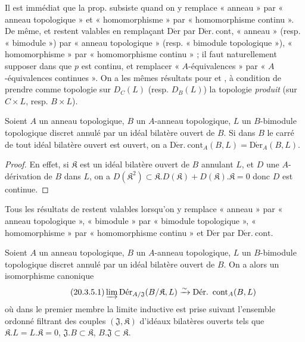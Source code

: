 \begin{env}[20.3.2]
\label{0.20.3.2-fr}
Il est immédiat que la prop.  subsiste quand on y remplace
« anneau » par « anneau topologique » et « homomorphisme » par
« homomorphisme continu ». De même,  et
 restent valables en remplaçant $\operatorname{D\acute{e}r}$ par
$\operatorname{D\acute{e}r.\ cont}$, « anneau » (resp. « bimodule ») par « anneau
topologique » (resp. « bimodule topologique »), « homomorphisme » par
« homomorphisme continu » ; il faut naturellement supposer dans
 que $p$ est continu, et remplacer « $A$-équivalences » par
« $A$-équivalences continues ». On a les mêmes résultats pour
 et , à condition de prendre comme
topologie sur $D_C(L)$ (resp. $D_B(L)$) la topologie \emph{produit} (sur
$C\times L$, resp. $B\times L$).
\end{env}

\begin{proposition}[20.3.3]
\label{0.20.3.3-fr}
Soient $A$ un anneau topologique, $B$ un $A$-anneau topologique, $L$ un
$B$-bimodule topologique discret annulé par un idéal bilatère ouvert de $B$.
Si dans $B$ le carré de tout idéal bilatère ouvert est ouvert, on a
$\operatorname{D\acute{e}r.\ cont}_A(B,L)=\operatorname{D\acute{e}r}_A(B,L)$.
\end{proposition}

\begin{proof}
En effet, si $\mathfrak{K}$ est un idéal bilatère ouvert de $B$ annulant $L$,
et $D$ une $A$-dérivation de $B$ dans $L$, on a
$D(\mathfrak{K}^2)\subset\mathfrak{K}.D(\mathfrak{K})+
D(\mathfrak{K}).\mathfrak{K}=0$  donc $D$ est continue.
\end{proof}

\begin{env}[20.3.4]
\label{0.20.3.4-fr}
Tous les résultats de  restent valables lorsqu'on y remplace
« anneau » par « anneau topologique », « bimodule » par « bimodule
topologique », « homomorphisme » par « homomorphisme continu » et
$\operatorname{D\acute{e}r}$ par $\operatorname{D\acute{e}r.\ cont}$.
\end{env}

\begin{proposition}[20.3.5]
\label{0.20.3.5-fr}
Soient $A$ un anneau topologique, $B$ un $A$-anneau topologique, $L$ un
$B$-bimodule topologique discret annulé par un idéal bilatère ouvert de $B$.
On a alors un isomorphisme canonique
\begin{equation}
\tag{20.3.5.1}
\label{0.20.3.5.1-fr}
  \varinjlim\operatorname{D\acute{e}r}_{A/\mathfrak{J}}
  (B/\mathfrak{K},L)\xrightarrow{\sim}
  \operatorname{D\acute{e}r.\ cont}_A(B,L)
\end{equation}
où dans le premier membre la limite inductive est prise suivant l'ensemble
ordonné filtrant des couples $(\mathfrak{J},\mathfrak{K})$ d'idéaux bilatères ouverts
tels que $\mathfrak{K}.L=L.\mathfrak{K}=0$,
$\mathfrak{J}.B\subset\mathfrak{K}$,
$B.\mathfrak{J}\subset\mathfrak{K}$.
\end{proposition}

